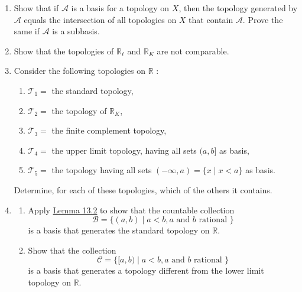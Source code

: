 \begin{enumerate}[itemsep=0.4em, parsep=0pt, topsep=0pt, partopsep=0pt, leftmargin=*, label=\arabic*., ref=\arabic*]
\begin{enumerate}[itemsep=0.2em, parsep=0pt, topsep=0pt, partopsep=0pt, leftmargin=*, label=(\alph*), align=left]
  \item Let \(\{ \mathcal{T}_{\alpha }\}\) be a family of topologies on \(X\). Show that there is a unique smallest topology on \(X\) containing all the collections \(\mathcal{T}_{\alpha }\), and a unique largest topology contained in all \(\mathcal{T}_{\alpha }\).
  \item If \(X = \{ a,b,c\}\), let \[ \mathcal{T}_{1} = \{ \varnothing,X,\{ a\},\{ a,b\} \} \;\text{ and }\;\mathcal{T}_{2} = \{ \varnothing,X,\{ a\},\{ b,c\} \}. \] Find the smallest topology containing \(\mathcal{T}_{1}\) and \(\mathcal{T}_{2}\), and the largest topology contained in \(\mathcal{T}_{1}\) and \(\mathcal{T}_{2}\).
  \end{enumerate}
\item Show that if \(\mathcal{A}\) is a basis for a topology on \(X\), then the topology generated by \(\mathcal{A}\) equals the intersection of all topologies on \(X\) that contain \(\mathcal{A}\). Prove the same if \(\mathcal{A}\) is a subbasis.
\item Show that the topologies of \(\mathbb{R}_{\ell }\) and \(\mathbb{R}_{K}\) are not comparable.
\item Consider the following topologies on \(\mathbb{R}\) :
  \begin{enumerate}[itemsep=0.2em, parsep=0pt, topsep=0pt, partopsep=0pt, leftmargin=3em, label={}]
  \item \(\mathcal{T}_{1} =\) the standard topology,
  \item \(\mathcal{T}_{2} =\) the topology of \(\mathbb{R}_{K}\),
  \item \(\mathcal{T}_{3} =\) the finite complement topology,
  \item \(\mathcal{T}_{4} =\) the upper limit topology, having all sets \((a, b]\) as basis,
  \item \(\mathcal{T}_{5} =\) the topology having all sets \(( {-\infty,a}) = \{ x \mid x < a\}\) as basis.
  \end{enumerate}
  Determine, for each of these topologies, which of the others it contains.
\item
  \begin{enumerate}[itemsep=0.2em, parsep=0pt, topsep=0pt, partopsep=0pt, leftmargin=*, label=(\alph*), align=left]
  \item Apply \hyperref[lem:13.2]{Lemma 13.2} to show that the countable collection \[ \mathcal{B} = \{ ( {a,b}) \mid a < b,a\text{ and }b\text{ rational }\} \] is a basis that generates the standard topology on \(\mathbb{R}\).

  \item Show that the collection \[ \mathcal{C} = \{ \lbrack a,b) \mid a < b,a\text{ and }b\text{ rational }\} \] is a basis that generates a topology different from the lower limit topology on \(\mathbb{R}\).
  \end{enumerate}
\end{enumerate}

